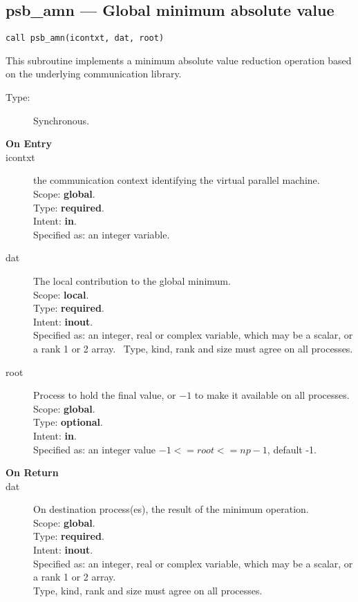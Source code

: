 \clearpage\subsection*{psb\_amn --- Global minimum absolute value}

\begin{verbatim}
call psb_amn(icontxt, dat, root)
\end{verbatim}

This subroutine implements a minimum absolute value reduction
operation based on the underlying communication library. 
\begin{description}
\item[Type:] Synchronous.
\item[\bf  On Entry ]
\item[icontxt] the communication context identifying the virtual
  parallel machine.\\
Scope: {\bf global}.\\
Type: {\bf required}.\\
Intent: {\bf in}.\\
Specified as: an integer variable.
\item[dat] The local contribution to the global minimum.\\
Scope: {\bf local}.\\
Type: {\bf required}.\\
Intent: {\bf inout}.\\
Specified as: an integer, real or complex variable, which may be a
scalar, or a rank 1 or 2 array. \
Type, kind, rank and size must agree on all processes.
\item[root] Process to hold the final value, or $-1$ to make it available
  on all processes.\\
Scope: {\bf global}.\\
Type: {\bf optional}.\\
Intent: {\bf in}.\\
Specified as: an integer value $-1<= root <= np-1$, default -1. \\
\end{description}


\begin{description}
\item[\bf On Return]
\item[dat] On destination process(es), the result of the minimum operation.\\
Scope: {\bf global}.\\
Type: {\bf required}.\\
Intent: {\bf inout}.\\
Specified as: an integer, real or complex variable, which may be a
scalar, or a rank 1 or 2 array. \\
Type, kind, rank and size must agree on all processes.
\end{description}


